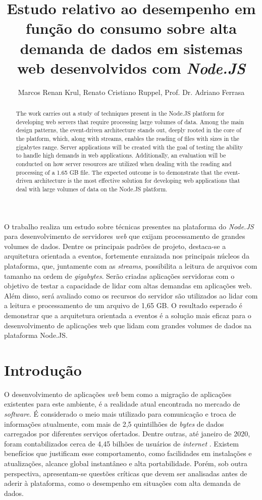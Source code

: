 \documentclass[12pt]{article}
\title{Estudo relativo ao desempenho em função do consumo sobre alta demanda de dados em sistemas web desenvolvidos com \textit{Node.JS}}
\author{Marcos Renan Krul\inst{1}, Renato Cristiano Ruppel\inst{1}, Prof. Dr. Adriano Ferrasa\inst{1}}
\begin{document}
 

\maketitle


\begin{resumo} 
O trabalho realiza um estudo sobre técnicas presentes na plataforma do \textit{Node.JS} para desenvolvimento de servidores \textit{web} 
que exijam processamento de grandes volumes de dados. Dentre os principais padrões de projeto, destaca-se a arquitetura orientada a eventos,
fortemente enraizada nos principais núcleos da plataforma, que, juntamente com as \textit{streams}, possibilita a leitura de arquivos 
com tamanho na ordem de \textit{gigabytes}. Serão criadas aplicações servidoras com o objetivo de testar a capacidade de lidar com altas 
demandas em aplicações web. Além disso, será avaliado como os recursos do servidor são utilizados ao lidar com a leitura e processamento 
de um arquivo de 1,65 GB. O resultado esperado é demonstrar que a arquitetura orientada a eventos é a solução mais eficaz para o 
desenvolvimento de aplicações web que lidam com grandes volumes de dados na plataforma Node.JS.
\end{resumo}


\begin{abstract} 
The work carries out a study of techniques present in the Node.JS platform for developing web servers that require processing large
volumes of data. Among the main design patterns, the event-driven architecture stands out, deeply rooted in the core of the platform, 
which, along with streams, enables the reading of files with sizes in the gigabytes range. Server applications will be created with the 
goal of testing the ability to handle high demands in web applications. Additionally, an evaluation will be conducted on how server 
resources are utilized when dealing with the reading and processing of a 1.65 GB file. The expected outcome is to demonstrate that the 
event-driven architecture is the most effective solution for developing web applications that deal with large volumes of data on the Node.JS platform.
\end{abstract}


\section{Introdução}

O desenvolvimento de aplicações \textit{web} bem como a migração de aplicações existentes para este ambiente,
é a realidade atual encontrada no mercado de \textit{software}. É considerado o meio mais utilizado
para comunicação e troca de informações atualmente, com mais de 2,5 quintilhões de \textit{bytes} de dados
carregados por diferentes serviços ofertados. Dentre outras, até janeiro de 2020, foram 
contabilizados cerca de 4,45 bilhões de usuários de \textit{internet} \cite{WEBUSAGE}. 
Existem benefícios que justificam esse comportamento, como facilidades em instalações e atualizações, 
alcance global instantâneo e alta portabilidade. Porém, sob outra perspectiva, apresentam-se questões 
críticas que devem ser analisadas antes de aderir à plataforma, como o desempenho em situações com 
alta demanda de dados.
\end{document}
